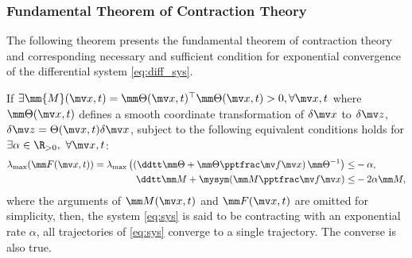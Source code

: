\subsubsection{Fundamental Theorem of Contraction Theory}

The following theorem presents the fundamental theorem of contraction theory and corresponding necessary and sufficient condition for exponential convergence of the differential system \eqref{eq:diff_sys}.

\begin{theorem}
    If $
        \exists \mm{M}(\bdx,t)
        =
        \mm\Theta(\bdx,t)^\top
        \mm\Theta(\bdx,t)
        > 0, \forall \bdx,t
    $ where $\mm\Theta(\bdx,t)$ defines a smooth coordinate transformation of $\delta\bdx$ to $\delta\bdz$, \ie $\delta\bdz = \Theta(\bdx,t)\delta\bdx$, subject to the following equivalent conditions holds for $\exists\alpha\in\R_{>0},\ \forall \bdx,t$:
    \begin{subequations}
        \begin{align}
            \lambda_{\max} (
                \mm F(\bdx,t)
            )
            =
            \lambda_{\max} 
            \left(
                \left(    
                \ddtt \mm\Theta
                +
                \mm\Theta\tpfpx
                \right)
                \mm\Theta^{-1}
            \right)
            \le&
            -\alpha
            ,
        \label{eq:ctrac:metric:F}
            \\
            \ddtt \mm M
            +
            \mysym(\mm M\tpfpx)
            \le&
            -2\alpha\mm M
            ,
        \label{eq:ctrac:metric:M}
        \end{align}
        \label{eq:ctrac:metric}
    \end{subequations}
    where the arguments of $\mm M(\bdx,t)$ and $\mm F(\bdx,t)$ are omitted for simplicity, then, the system \eqref{eq:sys} is said to be contracting with an exponential rate $\alpha$, \ie all trajectories of \eqref{eq:sys} converge to a single trajectory.
    The converse is also true.
    \label{thm:ctrac:main}
\end{theorem}

